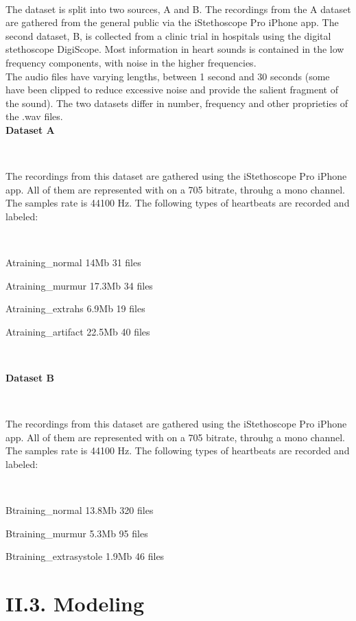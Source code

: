 \documentclass[11pt, a4papper]{report}
\theoremstyle{plain}
\theoremstyle{definition}
\theoremstyle{definition}
\theoremstyle{proposition}
\begin{document}
\

The dataset is split into two sources, A and B. The recordings from the A dataset are gathered from the general public via the iStethoscope Pro iPhone app. The second dataset, B, is collected from a clinic trial in hospitals using the digital stethoscope DigiScope. Most information in heart sounds is contained in the low frequency components, with noise in the higher frequencies.
\\

The audio files have varying lengths, between 1 second and 30 seconds (some have been clipped to reduce excessive noise and provide the salient fragment of the sound). The two datasets differ in number, frequency and other proprieties of the .wav files.
\\

\textbf{Dataset A}

\

The recordings from this dataset are gathered using the iStethoscope Pro iPhone app. All of them are represented with on a 705  bitrate, throuhg a mono channel. The samples rate is 44100 Hz. The following types of heartbeats are recorded and labeled:

\

Atraining\_normal 14Mb 31 files
\

Atraining\_murmur 17.3Mb 34 files
\

Atraining\_extrahs 6.9Mb 19 files
\

Atraining\_artifact 22.5Mb 40 files

\

\textbf{Dataset B}

\

The recordings from this dataset are gathered using the iStethoscope Pro iPhone app. All of them are represented with on a 705  bitrate, throuhg a mono channel. The samples rate is 44100 Hz. The following types of heartbeats are recorded and labeled:

\

Btraining\_normal 13.8Mb 320 files
\

Btraining\_murmur 5.3Mb 95 files
\

Btraining\_extrasystole 1.9Mb 46 files
\


\section*{II.3. Modeling}

\
\end{document}

